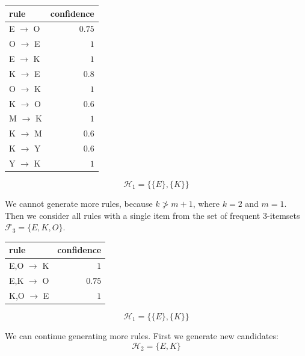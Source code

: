 \documentclass{article}
\begin{document}
  \begin{center}
    \begin{tabular}{|l|r|}
      \hline
      \textbf{rule} & \textbf{confidence} \\ \hline
      E $\to$ O & \textcolor{BrickRed}  {$0.75$} \\ \hline
      O $\to$ E & \textcolor{OliveGreen}{$1   $} \\ \hline
      E $\to$ K & \textcolor{OliveGreen}{$1   $} \\ \hline
      K $\to$ E & \textcolor{OliveGreen}{$0.8 $} \\ \hline
      O $\to$ K & \textcolor{OliveGreen}{$1   $} \\ \hline
      K $\to$ O & \textcolor{BrickRed}  {$0.6 $} \\ \hline
      M $\to$ K & \textcolor{OliveGreen}{$1   $} \\ \hline
      K $\to$ M & \textcolor{BrickRed}  {$0.6 $} \\ \hline
      K $\to$ Y & \textcolor{BrickRed}  {$0.6 $} \\ \hline
      Y $\to$ K & \textcolor{OliveGreen}{$1   $} \\ \hline
      \end{tabular}
  \end{center}

  $$\mathcal{H}_1 = \{\{E\}, \{K\}\}$$

  We cannot generate more rules, because $k \ngtr m + 1$, where $k=2$ and $m=1$. \\

  Then we consider all rules with a single item from the set of frequent 3-itemsets $\mathcal{F}_3 = \{E,K,O\}$.
  \begin{center}
    \begin{tabular}{|l|r|}
      \hline
      \textbf{rule} & \textbf{confidence} \\ \hline
      E,O $\to$ K & \textcolor{OliveGreen}{$1   $} \\ \hline
      E,K $\to$ O & \textcolor{BrickRed}  {$0.75$} \\ \hline
      K,O $\to$ E & \textcolor{OliveGreen}{$1   $} \\ \hline
      \end{tabular}
  \end{center}

  $$\mathcal{H}_1 = \{\{E\}, \{K\}\}$$

  We can continue generating more rules. First we generate new candidates:
  $$\mathcal{H}_2 = \{E, K\}$$
\end{document}
